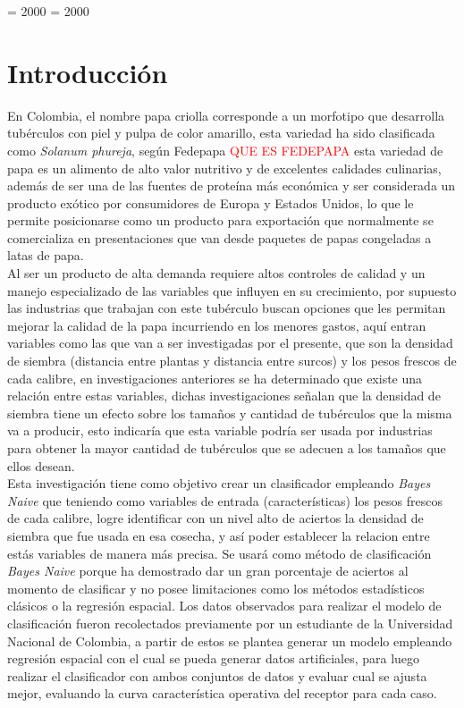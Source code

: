 
\righthyphenmin = 2000
\lefthyphenmin = 2000

\chapter*{Introducci\'on}

En Colombia, el nombre papa criolla corresponde a un morfotipo que desarrolla tubérculos con piel y pulpa de color amarillo, esta variedad ha sido clasificada como \textit{Solanum phureja}, según Fedepapa \textcolor{red}{ QUE ES FEDEPAPA} esta variedad de papa es un alimento de alto valor nutritivo y de excelentes calidades culinarias, además de ser una de las fuentes de proteína más económica y ser considerada un producto exótico por consumidores de Europa y Estados Unidos, lo que le permite posicionarse como un producto para exportación que normalmente se comercializa en presentaciones que van desde paquetes de papas congeladas a latas de papa.\\

Al ser un producto de alta demanda requiere altos controles de calidad  y un  manejo especializado de las variables que influyen en su crecimiento, por supuesto las industrias que trabajan con este tubérculo buscan opciones que les permitan mejorar la calidad de la papa incurriendo en los menores gastos, aquí entran variables como las que van a ser investigadas por el presente, que son la densidad de siembra (distancia entre plantas y distancia entre surcos) y los pesos frescos de cada calibre, en investigaciones anteriores se ha determinado que existe una relación entre estas variables, dichas investigaciones señalan que la densidad de siembra tiene un efecto sobre los tamaños y cantidad de tubérculos que la misma va a producir, esto indicaría que esta variable podría ser usada por industrias para obtener la mayor cantidad de tubérculos que se adecuen a los tamaños que ellos desean. \\

Esta investigación tiene como objetivo crear un clasificador empleando \textit{Bayes Naive} que teniendo como variables de entrada (características) los pesos frescos de cada calibre, logre identificar con un nivel alto de aciertos la densidad de siembra que fue usada en esa cosecha, y así poder establecer la relacion entre estás variables de manera más precisa. Se usará como método de clasificación \textit{Bayes Naive} porque ha demostrado dar un gran porcentaje de aciertos al momento de clasificar y no posee limitaciones como los métodos estadísticos clásicos o la regresión espacial. Los datos observados para realizar el modelo de clasificación fueron recolectados previamente por un estudiante de la Universidad Nacional de Colombia, a partir de estos se plantea generar un modelo empleando regresión espacial con el cual se pueda generar datos artificiales, para luego realizar el clasificador con ambos conjuntos de datos y evaluar cual se ajusta mejor, evaluando la curva característica operativa del receptor para cada caso.\\ 


